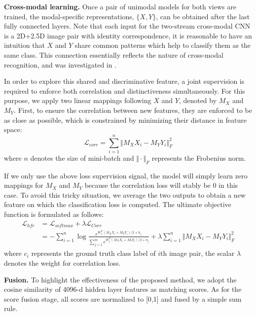 \documentclass{bmvc2k}
\begin{document}
\textbf{Cross-modal learning.} Once a pair of unimodal models for both views are trained, the modal-specific representations, $\{X,Y\}$, can be obtained after the last fully connected layers. Note that each input for the two-stream cross-modal CNN is a 2D+2.5D image pair with identity correspondence, it is reasonable to have an intuition that $X$ and $Y$ share common patterns which help to classify them as the same class. This connection essentially reflects the nature of cross-modal recognition, and was investigated in \cite{wang2016correlated, huang2012oriented, wang20142d}. 

In order to explore this shared and discriminative feature, a joint supervision is required to enforce both correlation and distinctiveness simultaneously. For this purpose, we apply two linear mappings following $X$ and $Y$, denoted by $M_X$ and $M_Y$. First, to ensure the correlation between new features, they are enforced to be as close as possible, which is constrained by minimizing their distance in feature space:
\begin{equation}\label{frob}
\mathcal{L}_{corr} = \sum_{i=1}^{n}\Vert M_X X_i - M_Y Y_i\Vert_F^2
\end{equation}
where $n$ denotes the size of mini-batch and $\Vert\cdot\Vert_F$ represents the Frobenius norm.

If we only use the above loss supervision signal, the model will simply learn zero mappings for $M_X$ and $M_Y$ because the correlation loss will stably be 0 in this case. To avoid this tricky situation, we average the two outputs to obtain a new feature on which the classification loss is computed. The ultimate objective function is formulated as follows:
\begin{align*}\label{eqhfr}
\mathcal{L}_{hfr} &= \mathcal{L}_{softmax} + \lambda\mathcal{L}_{Corr}\\
&= -\sum_{i=1}^{n}\log\frac{e^{W_{c_i}^T(M_X X_i + M_Y Y_i)/2+b_{c_i}}}{\sum_{j=1}^m e^{W_{j}^T(M_X X_i + M_Y Y_i)/2+b_{j}}} + \lambda\sum_{i=1}^{n}\Vert M_X X_i - M_Y Y_i\Vert_F^2
\end{align*}
where $c_i$ represents the ground truth class label of $i$th image pair, the scalar $\lambda$ denotes the weight for correlation loss.

\textbf{Fusion.} To highlight the effectiveness of the proposed method, we adopt the cosine similarity of 4096-d hidden layer features as matching scores. As for the score fusion stage, all scores are normalized to [0,1] and fused by a simple sum rule.
\end{document}
